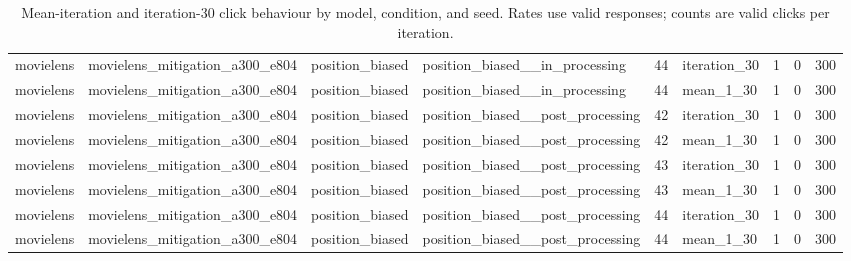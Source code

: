 \begin{table}[htbp!]
\begin{tabular}{llllrlrrr}
movielens & movielens\_mitigation\_a300\_e804 & position\_biased & position\_biased\_\_in\_processing & 44 & iteration\_30 & 1 & 0 & 300 \\
movielens & movielens\_mitigation\_a300\_e804 & position\_biased & position\_biased\_\_in\_processing & 44 & mean\_1\_30 & 1 & 0 & 300 \\
movielens & movielens\_mitigation\_a300\_e804 & position\_biased & position\_biased\_\_post\_processing & 42 & iteration\_30 & 1 & 0 & 300 \\
movielens & movielens\_mitigation\_a300\_e804 & position\_biased & position\_biased\_\_post\_processing & 42 & mean\_1\_30 & 1 & 0 & 300 \\
movielens & movielens\_mitigation\_a300\_e804 & position\_biased & position\_biased\_\_post\_processing & 43 & iteration\_30 & 1 & 0 & 300 \\
movielens & movielens\_mitigation\_a300\_e804 & position\_biased & position\_biased\_\_post\_processing & 43 & mean\_1\_30 & 1 & 0 & 300 \\
movielens & movielens\_mitigation\_a300\_e804 & position\_biased & position\_biased\_\_post\_processing & 44 & iteration\_30 & 1 & 0 & 300 \\
movielens & movielens\_mitigation\_a300\_e804 & position\_biased & position\_biased\_\_post\_processing & 44 & mean\_1\_30 & 1 & 0 & 300 \\
\hline
\end{tabular}
\caption{Mean-iteration and iteration-30 click behaviour by model, condition, and seed. Rates use valid responses; counts are valid clicks per iteration.}
\label{chap:results:tab:rq4_click_behaviour}
\end{table}
